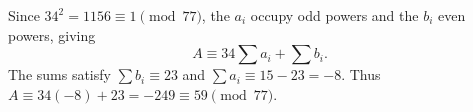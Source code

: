 Since $34^2=1156\equiv1\pmod{77}$, the $a_i$ occupy odd powers and the $b_i$ even powers, giving
\[
A\equiv34\sum a_i+\sum b_i.
\]
The sums satisfy $\sum b_i\equiv23$ and $\sum a_i\equiv15-23=-8$. Thus $A\equiv34(-8)+23=-249\equiv\boxed{59}\pmod{77}$.
